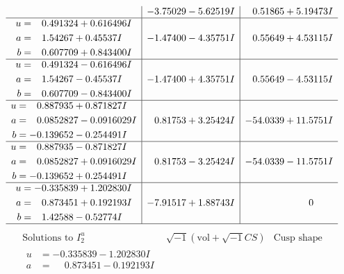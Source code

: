 \documentclass[1p]{elsarticle_modified}
\theoremstyle{definition}
\newcommand{\I}{\sqrt{-1}}
\begin{document}
$$\begin{array}{c|c|c}
 & -3.75029 - 5.62519 I & \phantom{-}0.51865 + 5.19473 I \\ \hline\begin{aligned}
u &= \phantom{-}0.491324 + 0.616496 I \\
a &= \phantom{-}1.54267 + 0.45537 I \\
b &= \phantom{-}0.607709 + 0.843400 I\end{aligned}
 & -1.47400 - 4.35751 I & \phantom{-}0.55649 + 4.53115 I \\ \hline\begin{aligned}
u &= \phantom{-}0.491324 - 0.616496 I \\
a &= \phantom{-}1.54267 - 0.45537 I \\
b &= \phantom{-}0.607709 - 0.843400 I\end{aligned}
 & -1.47400 + 4.35751 I & \phantom{-}0.55649 - 4.53115 I \\ \hline\begin{aligned}
u &= \phantom{-}0.887935 + 0.871827 I \\
a &= \phantom{-}0.0852827 - 0.0916029 I \\
b &= -0.139652 - 0.254491 I\end{aligned}
 & \phantom{-}0.81753 + 3.25424 I & -54.0339 + 11.5751 I \\ \hline\begin{aligned}
u &= \phantom{-}0.887935 - 0.871827 I \\
a &= \phantom{-}0.0852827 + 0.0916029 I \\
b &= -0.139652 + 0.254491 I\end{aligned}
 & \phantom{-}0.81753 - 3.25424 I & -54.0339 - 11.5751 I \\ \hline\begin{aligned}
u &= -0.335839 + 1.202830 I \\
a &= \phantom{-}0.873451 + 0.192193 I \\
b &= \phantom{-}1.42588 - 0.52774 I\end{aligned}
 & -7.91517 + 1.88743 I & \phantom{-0.000000 } 0\\
 \hline 
 \end{array}$$\newpage$$\begin{array}{c|c|c}  
\text{Solutions to }I^u_{2}& \I (\text{vol} + \sqrt{-1}CS) & \text{Cusp shape}\\
 \hline 
\begin{aligned}
u &= -0.335839 - 1.202830 I \\
a &= \phantom{-}0.873451 - 0.192193 I \\

\end{aligned}
\end{array}$$
\end{document}
